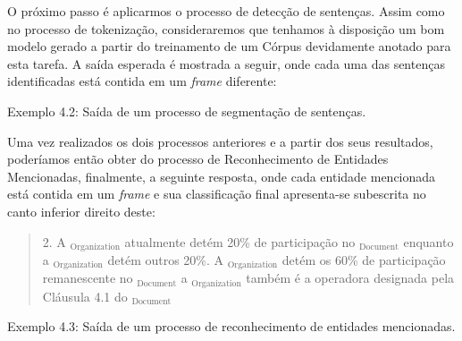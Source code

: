 \documentclass[11pt]{report}
\begin{document}
O próximo passo é aplicarmos o processo de detecção de sentenças. Assim como no processo de tokenização, consideraremos que tenhamos à disposição um bom modelo
gerado a partir do treinamento de um Córpus devidamente anotado para esta tarefa. A saída esperada é mostrada a seguir, onde cada uma das sentenças identificadas está contida
em um \textit{frame} diferente:

\begin{quote}
\end{quote}

\begin{quote}
\end{quote}

\begin{quote}
\end{quote}

\begin{center}
  Exemplo 4.2: Saída de um processo de segmentação de sentenças.
\end{center}

Uma vez realizados os dois processos anteriores e a partir dos seus resultados, poderíamos então obter do processo de Reconhecimento de Entidades Mencionadas,
finalmente, a seguinte resposta, onde cada entidade mencionada está contida em um \textit{frame} e sua classificação final apresenta-se subescrita no canto inferior direito deste:

\begin{quote}
  \begin{varwidth}{0.95\textwidth}
  2. A $_{\text{Organization}}$ atualmente detém 20\% de participação no $_{\text{Document}}$ enquanto a $_{\text{Organization}}$
  detém outros 20\%. A $_{\text{Organization}}$ detém os 60\% de participação remanescente no $_{\text{Document}}$ a
  $_{\text{Organization}}$ também é a operadora designada pela Cláusula 4.1 do $_{\text{Document}}$
  \end{varwidth}
\end{quote}
\begin{center}
  Exemplo 4.3: Saída de um processo de reconhecimento de entidades mencionadas.
\end{center}
\end{document}
